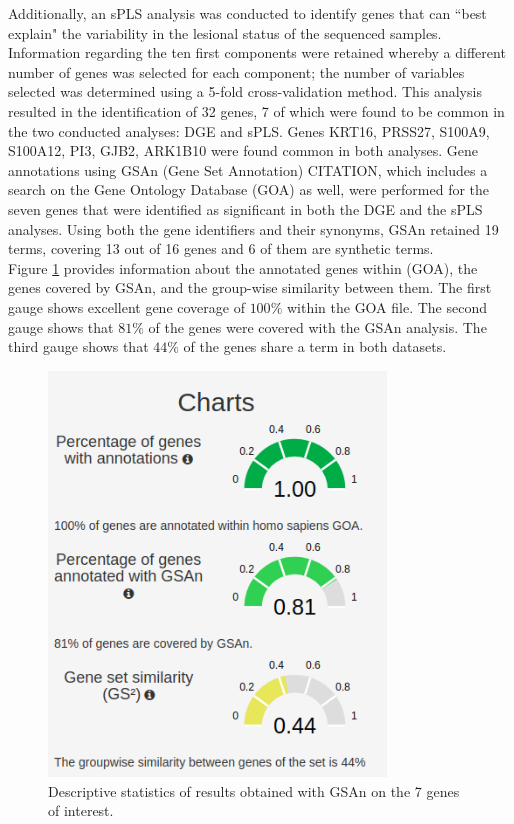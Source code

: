 \documentclass[journal, a4paper]{IEEEtran}
\begin{document}
Additionally, an sPLS analysis was conducted to identify genes that can ``best explain" the variability in the lesional status of the sequenced samples. Information regarding the ten first components were retained whereby a different number of genes was selected for each component; the number of variables selected was determined using a 5-fold cross-validation method. This analysis resulted in the identification of 32 genes, 7 of which were found to be common in the two conducted analyses: DGE and sPLS. Genes KRT16, PRSS27, S100A9, S100A12, PI3, GJB2, ARK1B10 were found common in both analyses. Gene annotations using GSAn (Gene Set Annotation) CITATION, which includes a search on the Gene Ontology Database (GOA) as well, were performed for the seven genes that were identified as significant in both the DGE and the sPLS analyses. Using both the gene identifiers and their synonyms, GSAn retained 19 terms, covering 13 out of 16 genes and 6 of them are synthetic terms.\\

Figure \ref{fig:gsan-chart} provides information about the annotated genes within (GOA), the genes covered by GSAn, and the group-wise similarity between them. The first gauge shows excellent gene coverage of $100\%$ within the GOA file. The second gauge shows that $81\%$ of the genes were covered with the GSAn analysis. The third gauge shows that $44\%$ of the genes share a term in both datasets. \\

\begin{figure}[!htp]
  \begin{center}
    \begin{minipage}{0.5 \textwidth}
      \centering
      \includegraphics[width=0.8\textwidth]{gsan-charts.png}
      \caption{Descriptive statistics of results obtained with GSAn on the 7 genes of interest.}
      \label{fig:gsan-chart}
    \end{minipage}
  \end{center}
\end{figure}
\end{document}
